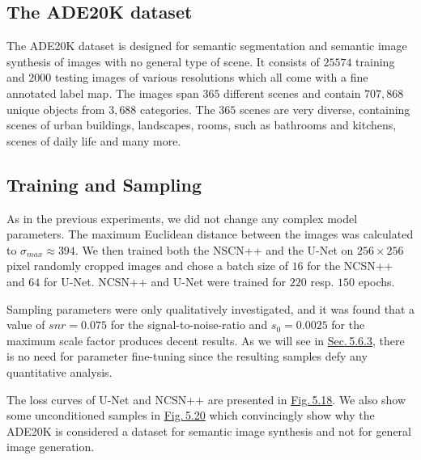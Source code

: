 \subsection{The ADE20K dataset}
The ADE20K dataset \cite{ade20k}  is designed for semantic segmentation and semantic image synthesis of images with no general type of scene. It consists of $25574$ training and $2000$ testing images of various resolutions which all come with a fine annotated label map. The images span $365$ different scenes and contain $707{,}868$ unique objects from $3{,}688$ categories. The $365$ scenes are very diverse, containing scenes of urban buildings, landscapes, rooms, such as bathrooms and kitchens, scenes of daily life and many more. 
%
\subsection{Training and Sampling}
As in the previous experiments, we did not change any complex model parameters. The maximum Euclidean distance between the images was calculated to $\sigma_{max}\approx394$. We then trained both the NSCN++ and the U-Net on $256\times256$ pixel randomly cropped images and chose a batch size of $16$ for the NCSN++ and $64$ for U-Net. NCSN++ and U-Net were trained for $220$ resp. $150$ epochs.

Sampling parameters were only qualitatively investigated, and it was found that a value of $snr=0.075$ for the signal-to-noise-ratio and $s_0=0.0025$ for the maximum scale factor produces decent results. As we will see in \hyperref[sec:5.6.3]{Sec.\,5.6.3}, there is no need for parameter fine-tuning since the resulting samples defy any quantitative analysis.

The loss curves of U-Net and NCSN++ are presented in \hyperref[fig:5.18]{Fig.\,5.18}. We also show some unconditioned samples in \hyperref[fig:5.20]{Fig.\,5.20} which convincingly show why the ADE20K is considered a dataset for semantic image synthesis and not for general image generation.

